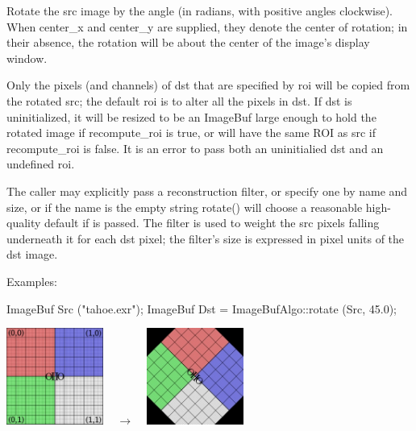 Rotate the {\cf src} image by the {\cf angle} (in radians, with positive
angles clockwise). When {\cf center_x} and {\cf center_y} are supplied, they
denote the center of rotation; in their absence, the rotation will be about
the center of the image's display window.

Only the pixels (and channels) of {\cf dst} that are specified by {\cf roi}
will be copied from the rotated {\cf src}; the default {\cf roi} is to alter
all the pixels in {\cf dst}. If {\cf dst} is uninitialized, it will be
resized to be an ImageBuf large enough to hold the rotated image  if
{\cf recompute_roi} is {\cf true}, or will have the same ROI as {\cf src}
if {\cf recompute_roi} is false. It is an
error to pass both an uninitialied {\cf dst} and an undefined {\cf roi}.

The caller may explicitly pass a reconstruction filter, or specify one by
name and size, or if the name is the empty string {\cf rotate()} will choose
a reasonable high-quality default if \NULL is passed.  The filter is used to
weight the {\cf src} pixels falling underneath it for each {\cf dst} pixel;
the filter's size is expressed in pixel units of the {\cf dst} image.

\smallskip
\noindent Examples:
\begin{code}
    ImageBuf Src ("tahoe.exr");
    ImageBuf Dst = ImageBufAlgo::rotate (Src, 45.0);
\end{code}
\spc \includegraphics[width=1.25in]{figures/grid-small.jpg} 
~ {\Huge $\rightarrow$} ~
\includegraphics[width=1.25in]{figures/rotate45.jpg} \\
\apiend


